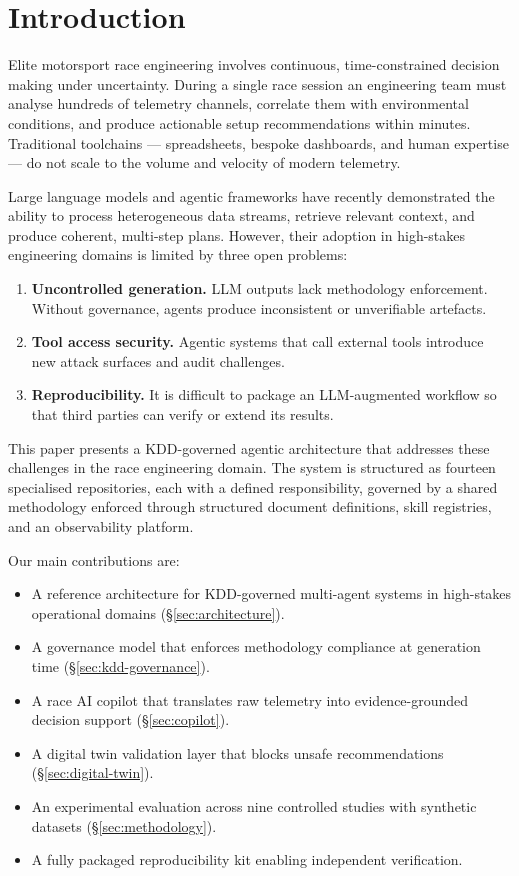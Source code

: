\section{Introduction}
\label{sec:introduction}

Elite motorsport race engineering involves continuous, time-constrained decision
making under uncertainty. During a single race session an engineering team must
analyse hundreds of telemetry channels, correlate them with environmental
conditions, and produce actionable setup recommendations within minutes.
Traditional toolchains --- spreadsheets, bespoke dashboards, and human expertise
--- do not scale to the volume and velocity of modern telemetry.

Large language models and agentic frameworks have recently demonstrated the ability
to process heterogeneous data streams, retrieve relevant context, and produce
coherent, multi-step plans. However, their adoption in high-stakes engineering
domains is limited by three open problems:

\begin{enumerate}
  \item \textbf{Uncontrolled generation.} LLM outputs lack methodology enforcement.
    Without governance, agents produce inconsistent or unverifiable artefacts.
  \item \textbf{Tool access security.} Agentic systems that call external tools
    introduce new attack surfaces and audit challenges.
  \item \textbf{Reproducibility.} It is difficult to package an LLM-augmented
    workflow so that third parties can verify or extend its results.
\end{enumerate}

This paper presents a KDD-governed agentic architecture that addresses these
challenges in the race engineering domain. The system is structured as fourteen
specialised repositories, each with a defined responsibility, governed by a
shared methodology enforced through structured document definitions, skill
registries, and an observability platform.

Our main contributions are:

\begin{itemize}
  \item A reference architecture for KDD-governed multi-agent systems in
    high-stakes operational domains (\S\ref{sec:architecture}).
  \item A governance model that enforces methodology compliance at generation
    time (\S\ref{sec:kdd-governance}).
  \item A race AI copilot that translates raw telemetry into evidence-grounded
    decision support (\S\ref{sec:copilot}).
  \item A digital twin validation layer that blocks unsafe recommendations
    (\S\ref{sec:digital-twin}).
  \item An experimental evaluation across nine controlled studies with synthetic
    datasets (\S\ref{sec:methodology}).
  \item A fully packaged reproducibility kit enabling independent verification.
\end{itemize}
